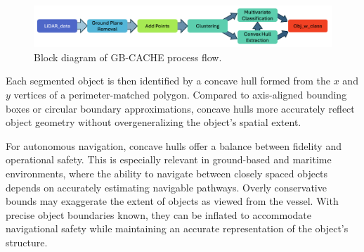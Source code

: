 \documentclass{erauthesis}
\begin{document}
\begin{figure}
    \centering
    \includegraphics[width=0.95\linewidth]{Images/gbcache/gbcache_flow.png}
    \caption{Block diagram of GB-CACHE process flow.}
    \label{fig:gbcache_flow}
\end{figure}

Each segmented object is then identified by a concave hull formed from the $x$ and $y$ vertices of a perimeter-matched polygon.
Compared to axis-aligned bounding boxes or circular boundary approximations, concave hulls more accurately reflect object geometry without overgeneralizing the object’s spatial extent.

For autonomous navigation, concave hulls offer a balance between fidelity and operational safety.
This is especially relevant in ground-based and maritime environments, where the ability to navigate between closely spaced objects depends on accurately estimating navigable pathways.
Overly conservative bounds may exaggerate the extent of objects as viewed from the vessel.
With precise object boundaries known, they can be inflated to accommodate navigational safety while maintaining an accurate representation of the object's structure.









\end{document}
